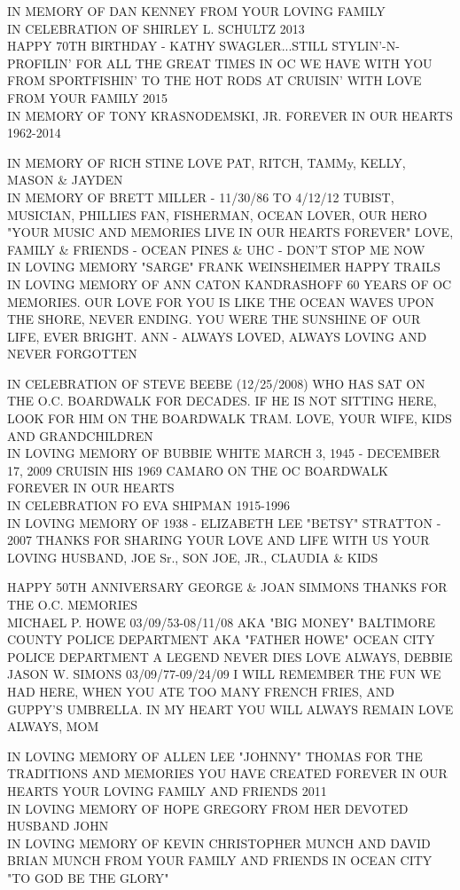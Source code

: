 \documentclass[10pt,letterpaper]{article}
\begin{document}
IN MEMORY OF DAN KENNEY FROM YOUR LOVING FAMILY\\
IN CELEBRATION OF SHIRLEY L. SCHULTZ 2013\\
HAPPY 70TH BIRTHDAY {-} KATHY SWAGLER...STILL STYLIN'{-}N{-}PROFILIN' FOR ALL THE GREAT TIMES IN OC WE HAVE WITH YOU FROM SPORTFISHIN' TO THE HOT RODS AT CRUISIN' WITH LOVE FROM YOUR FAMILY 2015\\
IN MEMORY OF TONY KRASNODEMSKI, JR.  FOREVER IN OUR HEARTS 1962{-}2014

IN MEMORY OF RICH STINE LOVE PAT, RITCH, TAMMy, KELLY, MASON \& JAYDEN\\
IN MEMORY OF BRETT MILLER {-} 11/30/86 TO 4/12/12 TUBIST, MUSICIAN, PHILLIES FAN, FISHERMAN, OCEAN LOVER, OUR HERO "YOUR MUSIC AND MEMORIES LIVE IN OUR HEARTS FOREVER" LOVE, FAMILY \& FRIENDS {-} OCEAN PINES \& UHC {-} DON'T STOP ME NOW\\
IN LOVING MEMORY "SARGE" FRANK WEINSHEIMER HAPPY TRAILS\\
IN LOVING MEMORY OF ANN CATON KANDRASHOFF 60 YEARS OF OC MEMORIES.  OUR LOVE FOR YOU IS LIKE THE OCEAN WAVES UPON THE SHORE, NEVER ENDING.  YOU WERE THE SUNSHINE OF OUR LIFE, EVER BRIGHT.  ANN {-} ALWAYS LOVED, ALWAYS LOVING AND NEVER FORGOTTEN

IN CELEBRATION OF STEVE BEEBE (12/25/2008) WHO HAS SAT ON THE O.C. BOARDWALK FOR DECADES.  IF HE IS NOT SITTING HERE, LOOK FOR HIM ON THE BOARDWALK TRAM.  LOVE, YOUR WIFE, KIDS AND GRANDCHILDREN\\
IN LOVING MEMORY OF BUBBIE WHITE MARCH 3, 1945 {-} DECEMBER 17, 2009 CRUISIN HIS 1969 CAMARO ON THE OC BOARDWALK FOREVER IN OUR HEARTS\\
IN CELEBRATION FO EVA SHIPMAN 1915{-}1996\\
IN LOVING MEMORY OF 1938 {-} ELIZABETH LEE "BETSY" STRATTON {-} 2007 THANKS FOR SHARING YOUR LOVE AND LIFE WITH US YOUR LOVING HUSBAND, JOE Sr., SON JOE, JR., CLAUDIA \& KIDS

HAPPY 50TH ANNIVERSARY GEORGE \& JOAN SIMMONS THANKS FOR THE O.C. MEMORIES\\
MICHAEL P. HOWE 03/09/53{-}08/11/08 AKA "BIG MONEY" BALTIMORE COUNTY POLICE DEPARTMENT AKA "FATHER HOWE" OCEAN CITY POLICE DEPARTMENT A LEGEND NEVER DIES LOVE ALWAYS, DEBBIE\\
JASON W. SIMONS 03/09/77{-}09/24/09 I WILL REMEMBER THE FUN WE HAD HERE, WHEN YOU ATE TOO MANY FRENCH FRIES, AND GUPPY'S UMBRELLA.  IN MY HEART YOU WILL ALWAYS REMAIN LOVE ALWAYS, MOM

IN LOVING MEMORY OF ALLEN LEE "JOHNNY" THOMAS FOR THE TRADITIONS AND MEMORIES YOU HAVE CREATED FOREVER IN OUR HEARTS YOUR LOVING FAMILY AND FRIENDS 2011\\
IN LOVING MEMORY OF HOPE GREGORY FROM HER DEVOTED HUSBAND JOHN\\
IN LOVING MEMORY OF KEVIN CHRISTOPHER MUNCH AND DAVID BRIAN MUNCH FROM YOUR FAMILY AND FRIENDS IN OCEAN CITY "TO GOD BE THE GLORY"
\end{document}

